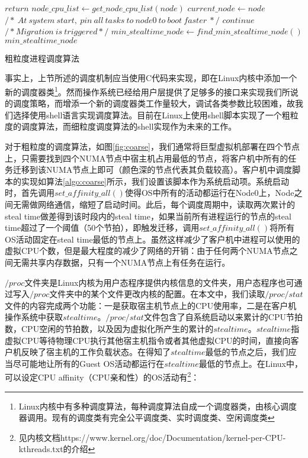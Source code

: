 \begin{algorithm}[h]
\begin{algorithmic}[ruled,1]
\State $return$
\EndIf
\State $node\_cpu\_list \gets get\_node\_cpu\_list(node)$
\State
{}
\State
{}
\State
{}
\EndFor
\State $current\_node \gets node$
\EndFunction
\State
\State $/*\ At\ system\ start,\ pin\ all\ tasks\ to\ node0\ to\ boot\ faster\ */$
\State
{}
\State
{}
\State
{}
\State $continue$
\EndIf
\State $/* Migration\ is\ triggered */$
\State $min\_stealtime\_node \gets find\_min\_stealtime\_node()$
\State
{} {$min\_stealtime\_node$}
\EndWhile
\end{algorithmic}
\caption{粗粒度进程调度算法}
\label{algo:coarse}
\end{algorithm}
事实上，上节所述的调度机制应当使用C代码来实现，即在Linux内核中添加一个新的调度器类\footnote{Linux内核中有多种调度算法，每种调度算法自成一个调度器类，由核心调度器调用。现有的调度类有完全公平调度类、实时调度类、空闲调度类}。然而操作系统已经给用户层提供了足够多的接口来实现我们所说的调度策略，而增添一个新的调度器类工作量较大，调试各类参数比较困难，故我们选择使用shell语言实现调度算法。目前在Linux上使用shell脚本实现了一个粗粒度的调度算法，而细粒度调度算法的shell实现作为未来的工作。

对于粗粒度的调度算法，如图\ref{fig:coarse}，我们通常将巨型虚拟机部署在四个节点上，只需要找到四个NUMA节点中宿主机占用最低的节点，将客户机中所有的任务迁移到该NUMA节点上即可（颜色深的节点代表其负载较高）。客户机中调度脚本的实现如算法\ref{algo:coarse}所示，我们设置该脚本作为系统启动项。系统启动时，首先调用$set\_affinity\_all()$使得OS中所有的活动都运行在Node0上，Node之间无需做网络通信，缩短了启动时间。此后，每个调度周期中，读取两次累计的steal time做差得到该时段内的steal time，如果当前所有进程运行的节点的steal time超过了一个阈值（50个节拍），即触发迁移，调用$set\_affinity\_all()$将所有OS活动固定在steal time最低的节点上。虽然这样减少了客户机中进程可以使用的虚拟CPU个数，但是最大程度的减少了网络的开销：由于任何两个NUMA节点之间无需共享内存数据，只有一个NUMA节点上有任务在运行。

$/proc$文件夹是Linux内核为用户态程序提供内核信息的文件夹，用户态程序也可通过写入$/proc$文件夹中的某个文件更改内核的配置。在本文中，我们读取$/proc/stat$文件的内容完成两个功能：一是获取宿主机节点上的CPU使用率，二是在客户机操作系统中获取$steal time$。$/proc/stat$文件包含了自系统启动以来累计的CPU节拍数，CPU空闲的节拍数，以及因为虚拟化所产生的累计的$steal time$。$steal time$指虚拟CPU等待物理CPU执行其他宿主机指令或者其他虚拟CPU的时间，直接向客户机反映了宿主机的工作负载状态。在得知了$steal time$最低的节点之后，我们应当尽可能地让所有的Guest OS活动都运行在$steal time$最低的节点上。在Linux中，可以设定CPU affinity（CPU亲和性）的OS活动有\footnote{见内核文档https://www.kernel.org/doc/Documentation/kernel-per-CPU-kthreads.txt的介绍}：

